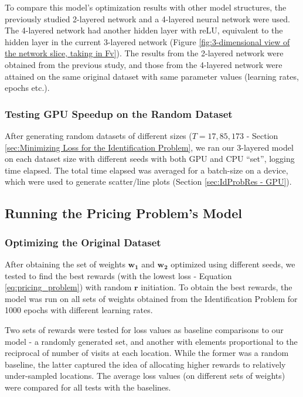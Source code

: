 \documentclass[12pt]{article}
\newcommand{\vect}[1]{\mathbf{#1}}  %
\newcommand{\matr}[1]{\mathbf{#1}}  %
\begin{document}
    To compare this model's optimization results with other model structures, the previously studied 2-layered network \cite{Xue2016Avi2} and a 4-layered neural network were used. The 4-layered network had another hidden layer with reLU, equivalent to the hidden layer in the current 3-layered network (Figure \ref{fig:3-dimensional view of the network slice, taking in Fv}). The results from the 2-layered network were obtained from the previous study, and those from the 4-layered network were attained on the same original dataset with same parameter values (learning rates, epochs etc.).
    
    \subsubsection{Testing GPU Speedup on the Random Dataset} \label{sec:Identification Problem-Testing GPU Speedup on the Random Dataset}
    After generating random datasets of different sizes ($T = 17, 85, 173$ - Section \ref{sec:Minimizing Loss for the Identification Problem}, we ran our 3-layered model on each dataset size with different seeds with both GPU and CPU ``set'', logging time elapsed. The total time elapsed was averaged for a batch-size on a device, which were used to generate scatter/line plots (Section \ref{sec:IdProbRes - GPU}).
    
    \subsection{Running the Pricing Problem's Model} \label{sec:Running the Pricing Problem's Model}
    \subsubsection{Optimizing the Original Dataset} \label{sec:Pricing Problem-Optimizing the Original Dataset}
    After obtaining the set of weights $\matr{w_1}$ and $\matr{w_2}$ optimized using different seeds, we tested to find the best rewards (with the lowest loss - Equation \ref{eq:pricing_problem}) with random $\vect{r}$ initiation. To obtain the best rewards, the model was run on all sets of weights obtained from the Identification Problem for 1000 epochs with different learning rates.
    
    Two sets of rewards were tested for loss values as baseline comparisons to our model - a randomly generated set, and another with elements proportional to the reciprocal of number of visits at each location. While the former was a random baseline, the latter captured the idea of allocating higher rewards to relatively under-sampled locations. The average loss values (on different sets of weights) were compared for all tests with the baselines.
    
\end{document}
